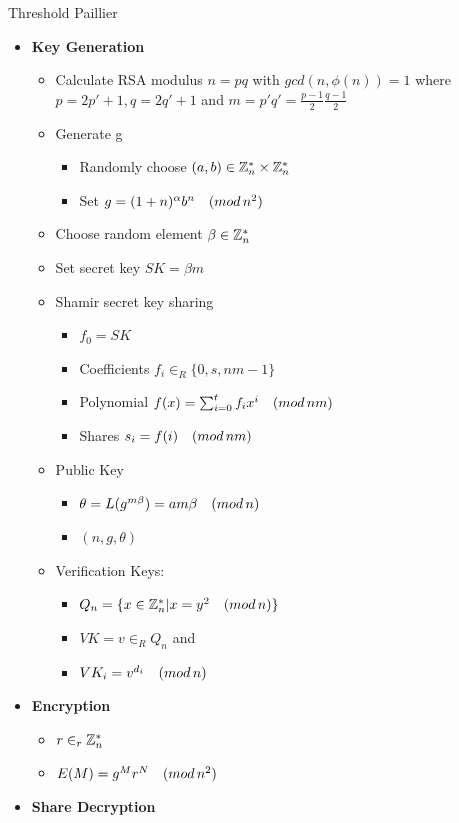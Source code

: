 \documentclass{beamer}
\begin{document}
\begin{frame}[allowframebreaks]{Threshold Paillier \cite{fouque2001sharing}}
\begin{itemize}
\item \textbf{Key Generation}
\begin{itemize}
\item Calculate RSA modulus $n = p  q$ with $gcd(n,\phi(n))=1$ where $p=2p'+1, q=2q'+1$ and $m=p'  q' = \frac{p-1}{2}  \frac{q-1}{2}$ 
\item Generate g
\begin{itemize}
\item Randomly choose $(a,b) \in \mathbb{Z}_{n}^* \times \mathbb{Z}_{n}^*$ 
\item Set $g=(1+n)^\alpha  b^n \quad (mod \, {n^2})$
\end{itemize}
\item Choose random element $\beta \in \mathbb{Z}_{n}^*$
\item Set secret key $SK=\beta  m$ 
\item Shamir secret key sharing
\begin{itemize}
\item $f_0 = SK$
\item Coefficients $f_i \in_R \{0, s, n  m - 1 \}$ 
\item Polynomial $f(x) = \sum_{i=0}^t f_i  x^i \quad (mod \, {nm})$
\item Shares $ s_i = f(i) \quad (mod \, {nm}) $
\end{itemize}
\item Public Key
\begin{itemize}
\item $\theta = L(g^{m  \beta}) = a  m  \beta \quad (mod \, {n})$
\item $(n,g,\theta)$
\end{itemize}
\item Verification Keys:
\begin{itemize}
\item $Q_n =  \{ x \in \mathbb{Z}_{n}^* | x=y^2 \quad (mod \, {n})  \} $
\item $VK = v \in_R Q_n$ and 
\item $VK_i = v^{d_i} \quad (mod \, {n}) $ 
\end{itemize}
\end{itemize}
\item \textbf{Encryption}
\begin{itemize}
\item $r \in_r \mathbb{Z}_{n}^*$
\item $E(M) = g^M  r^N  \quad (mod \, {n^2})$
\end{itemize}
\item \textbf{Share Decryption}

\end{itemize}
\end{frame}
\end{document}
